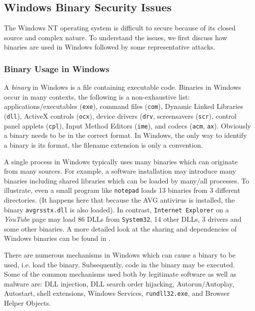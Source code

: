\subsection{Windows Binary Security Issues}
\label{sec:problems}

The Windows NT operating system
is difficult to secure
because of its closed source and complex nature.
To understand the issues, we first discuss how
binaries are used in Windows followed
by some representative attacks.

\subsubsection{Binary Usage in Windows}

A {\em binary} in Windows is a file containing executable code.
Binaries in Windows occur in many contexts,
the following is a non-exhaustive list:
applications/executables ({\tt exe}),
command files ({\tt com}),
Dynamic Linked Libraries ({\tt dll}),
ActiveX controls ({\tt ocx}),
device drivers ({\tt drv},
screensavers ({\tt scr}),
control panel applets ({\tt cpl}),
Input Method Editors ({\tt ime}),
and codecs ({\tt acm}, {\tt ax}).
Obviously a binary needs to be in the correct format.
In Windows, the only way to identify a binary
is its format, the filename extension is only a convention.

A single process in Windows typically uses many binaries which
can originate from many sources.
For example, a software installation may introduce many binaries including
shared libraries which can be loaded by many/all processes.
To illustrate, even a small program like {\tt notepad}
loads 13 binaries from 3 different directories.
(It happens here that because the AVG antivirus is installed, the
binary {\tt avgrsstx.dll} is also loaded).
In contrast, {\tt Internet Explorer} on a {\em YouTube} page may load
86 DLLs from {\tt System32}, 14 other DLLs, 3 drivers and some other
binaries.
A more detailed look at the sharing and dependencies of Windows binaries
can be found in \cite{icse10}.

There are numerous mechanisms in Windows which can cause a binary to be used,
i.e. load the binary.
Subsequently, code in the binary may be executed.
Some of the common mechanisms used both by legitimate software
as well as malware are:
DLL injection, DLL search order hijacking, Autorun/Autoplay, Autostart,
shell extensions, Windows Services, {\tt rundll\linebreak[0]32.exe},
and Browser Helper Objects.


